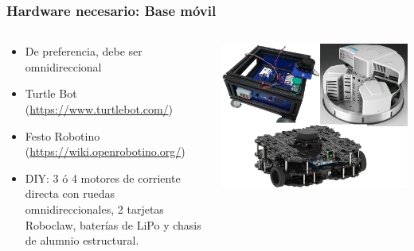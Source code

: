 \documentclass[10pt,spanish,aspectratio=1610]{beamer}
\begin{document}
\begin{frame}\frametitle{Hardware necesario: Base móvil}
  \begin{columns}
    \begin{column}{0.5\textwidth}
      \begin{itemize}
      \item De preferencia, debe ser omnidireccional
      \item Turtle Bot (\url{https://www.turtlebot.com/})
      \item Festo Robotino (\url{https://wiki.openrobotino.org/})
      \item DIY: 3 ó 4 motores de corriente directa con ruedas omnidireccionales, 2 tarjetas Roboclaw, baterías de LiPo y chasis de alumnio estructural.
      \end{itemize}
    \end{column}
    \begin{column}{0.5\textwidth}
      \includegraphics[width=\textwidth]{Figures/Bases.png}
    \end{column}
  \end{columns}
\end{frame}
\end{document}
